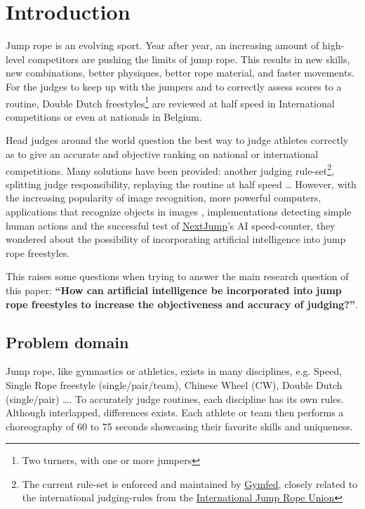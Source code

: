 
\section{Introduction}
\label{sec:introduction}

Jump rope is an evolving sport.
Year after year, an increasing amount of high-level competitors are pushing the limits of jump rope.
This results in new skills, new combinations, better physiques, better rope material, and faster movements. For the judges to keep up with the jumpers and to correctly assess scores to a routine, Double Dutch freestyles\footnote{Two turners, with one or more jumpers} are reviewed at half speed in International competitions or even at nationals in Belgium.

Head judges around the world question the best way to judge athletes correctly as to give an accurate and objective ranking on national or international competitions.
Many solutions have been provided: another judging rule-set\footnote{The current rule-set is enforced and maintained by \href{https://www.gymfed.be/}{Gymfed}, closely related to the international judging-rules from the \href{https://ijru.sport/}{International Jump Rope Union}}, splitting judge responsibility, replaying the routine at half speed \dots
However, with the increasing popularity of image recognition, more powerful computers, applications that recognize objects in images \autocite{Singh_Gill_2022}, implementations detecting simple human actions \autocite{LUQMAN_2022} and the successful test of \href{https://nextjump.app/}{NextJump}'s AI speed-counter, they wondered about the possibility of incorporating artificial intelligence into jump rope freestyles.

This raises some questions when trying to answer the main research question of this paper: \textbf{``How can artificial intelligence be incorporated into jump rope freestyles to increase the objectiveness and accuracy of judging?''}.

\subsection{Problem domain}

Jump rope, like gymnastics or athletics, exists in many disciplines, e.g. Speed, Single Rope freestyle (single/pair/team), Chinese Wheel (CW), Double Dutch (single/pair) \dots. To accurately judge routines, each discipline has its own rules. Although interlapped, differences exists. Each athlete or team then performs a choreography of 60 to 75 seconds showcasing their favorite skills and uniqueness.

